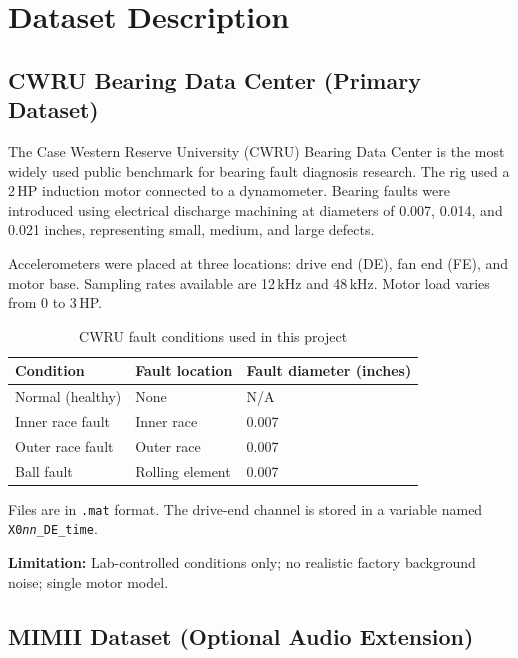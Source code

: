 \documentclass[12pt,a4paper]{article}
\begin{document}
\section{Dataset Description}

\subsection{CWRU Bearing Data Center (Primary Dataset)}

The Case Western Reserve University (CWRU) Bearing Data Center
\cite{loparo2012} is the most widely used public benchmark for
bearing fault diagnosis research. The rig used a 2\,HP induction
motor connected to a dynamometer. Bearing faults were introduced
using electrical discharge machining at diameters of 0.007, 0.014,
and 0.021 inches, representing small, medium, and large defects.

Accelerometers were placed at three locations: drive end (DE),
fan end (FE), and motor base. Sampling rates available are 12\,kHz
and 48\,kHz. Motor load varies from 0 to 3\,HP.

\begin{table}[htbp]
\centering
\caption{CWRU fault conditions used in this project}
\begin{tabular}{@{}lll@{}}
\toprule
\textbf{Condition} & \textbf{Fault location} &
  \textbf{Fault diameter (inches)} \\
\midrule
Normal (healthy)  & None        & N/A   \\
Inner race fault  & Inner race  & 0.007 \\
Outer race fault  & Outer race  & 0.007 \\
Ball fault        & Rolling element & 0.007 \\
\bottomrule
\end{tabular}
\label{tab:cwru}
\end{table}

Files are in \texttt{.mat} format. The drive-end channel is stored
in a variable named \texttt{X0\textit{nn}\_DE\_time}.

\textbf{Limitation:} Lab-controlled conditions only; no realistic
factory background noise; single motor model.

\subsection{MIMII Dataset (Optional Audio Extension)}
\end{document}
